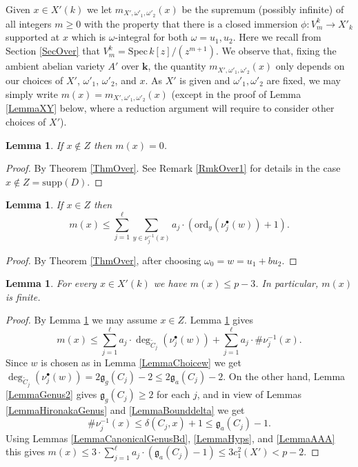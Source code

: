 \documentclass[11pt]{amsart}
\newtheorem{lemma}[theorem]{Lemma}
\theoremstyle{remark}
\numberwithin{equation}{section}
\newcommand{\gfrak}{\mathfrak{g}}
\newcommand{\kk}{\mathbf{k}}
\newcommand{\ord}{\mathrm{ord}}
\newcommand{\Spec}{\mathrm{Spec}\,}
\newcommand{\supp}{\mathrm{supp}}
\begin{document}
Given $x\in X'(k)$ we let $m_{X',\omega'_1,\omega'_2}(x)$ be the supremum (possibly infinite) of all integers $m\ge 0$ with the property that there is a closed immersion $\phi : V_m^k\to X'_k$ supported at $x$ which is $\omega$-integral for both $\omega=u_1,u_2$. Here we recall from Section \ref{SecOver} that $V^k_m=\Spec k[z]/(z^{m+1})$. We observe that, fixing the ambient abelian variety $A'$ over $\kk$,  the quantity $m_{X',\omega'_1,\omega'_2}(x)$ only depends on our choices of $X'$, $\omega'_1$, $\omega'_2$, and $x$. As $X'$ is given  and $\omega'_1,\omega'_2$ are fixed, we may simply write $m(x)=m_{X',\omega'_1,\omega'_2}(x)$ (except in the proof of Lemma \ref{LemmaXY} below, where a reduction argument will require to consider other choices of $X'$).

\begin{lemma}\label{Lemmamx0} If $x\notin Z$ then $m(x)=0$.
\end{lemma}
\begin{proof} By Theorem \ref{ThmOver}. See Remark \ref{RmkOver1} for details in the case $x\notin Z=\supp(D)$.
\end{proof}

\begin{lemma}\label{Lemmamx1} If $x\in Z$ then 
$$
m(x)\le \sum_{j=1}^\ell \sum_{y\in \nu_j^{-1}(x)} a_j\cdot (\ord_y(\nu_j^\bullet(w))+1).
$$
\end{lemma}
\begin{proof} By Theorem \ref{ThmOver}, after choosing $\omega_0=w=u_1+bu_2$.
\end{proof}




\begin{lemma}\label{Lemmamxp} For every $x\in X'(k)$ we have $m(x)\le p-3$. In particular, $m(x)$ is finite.
\end{lemma}
\begin{proof} By Lemma \ref{Lemmamx0} we may assume $x\in Z$. Lemma \ref{Lemmamx1} gives
$$
m(x)\le \sum_{j=1}^\ell  a_j\cdot \deg_{\widetilde{C}_j}(\nu_j^\bullet(w)) + \sum_{j=1}^\ell a_j\cdot \# \nu_j^{-1}(x).
$$
Since $w$ is chosen as in Lemma \ref{LemmaChoicew} we get $\deg_{\widetilde{C}_j}(\nu_j^\bullet(w))=2\gfrak_g(C_j)-2\le 2\gfrak_a(C_j)-2$. On the other hand, Lemma \ref{LemmaGenus2} gives $\gfrak_g(C_j)\ge 2$ for each $j$, and in view of Lemmas \ref{LemmaHironakaGenus} and \ref{LemmaBounddelta} we get
$$
\#\nu^{-1}_j(x)\le \delta(C_j,x)+1\le \gfrak_a(C_j)-1.
$$
Using Lemmas \ref{LemmaCanonicalGenusBd}, \ref{LemmaHyps}, and \ref{LemmaAAA} this gives $m(x)\le 3\cdot  \sum_{j=1}^\ell a_j\cdot (\gfrak_a(C_j)-1)\le 3c_1^2(X')<p-2$.
\end{proof}
\end{document}
